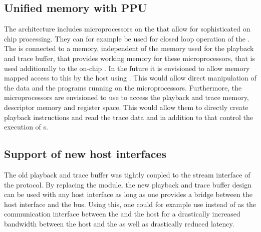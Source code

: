 \subsection{Unified memory with PPU}
The \BSSTwo{} architecture includes microprocessors on the \ASIC{} that allow for sophisticated on chip processing. They can for example be used for closed loop operation of the \ASIC{}. The \FPGA{} is connected to a \DDR{} memory, independent of the \DDR{} memory used for the playback and trace buffer, that provides working memory for these microprocessors, that is used additionally to the on-chip \SRAM{}. In the future it is envisioned to allow memory mapped access to this \DDR{} by the host using \FAXI{}. This would allow direct manipulation of the data and the programs running on the microprocessors. Furthermore, the microprocessors are envisioned to use \AXI{} to access the playback and trace memory, descriptor memory and \AXIDMA{} register space. This would allow them to directly create playback instructions and read the trace data and in addition to that control the execution of \PlaybackProgram{}s.

\subsection{Support of new host interfaces}
The old playback and trace buffer was tightly coupled to the stream interface of the \HostARQ{} protocol. By replacing the \FAXI{} module, the new playback and trace buffer design can be used with any host interface as long as one provides a bridge between the host interface and the \AXI{} bus. Using this, one could for example use \PCIe{} instead of \UDP{} as the communication interface between the \FPGA{} and the host for a drastically increased bandwidth between the host and the \FPGA{} as well as drastically reduced latency.
